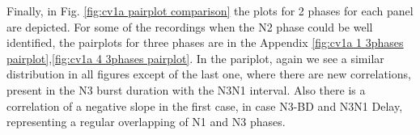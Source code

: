 Finally, in Fig. \ref{fig:cv1a pairplot comparison} the plots for 2 phases for each panel are depicted. For some of the recordings when the N2 phase could be well identified, the pairplots for three phases are in the Appendix \ref{fig:cv1a 1 3phases pairplot},\ref{fig:cv1a 4 3phases pairplot}. In the pariplot, again we see a similar distribution in all figures except of the last one, where there are new correlations, present in the N3 burst duration with the N3N1 interval. Also there is a correlation of a negative slope in the first case, in case N3-BD and N3N1 Delay, representing a regular overlapping of N1 and N3 phases. 
%

